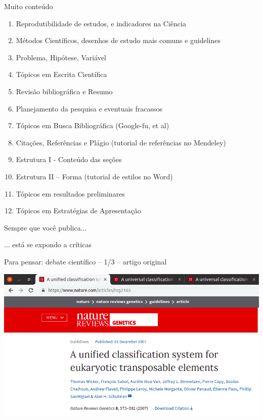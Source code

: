 \documentclass{beamer}
\begin{document}
\begin{frame}{Muito conteúdo}
  \begin{enumerate}
    \scriptsize
  \item Reprodutibilidade de estudos, e indicadores na Ciência
  \item Métodos Científicos, desenhos de estudo mais comuns e guidelines
  \item Problema, Hipótese, Variável
  \item Tópicos em Escrita Científica
  \item Revisão bibliográfica e Resumo
  \item Planejamento da pesquisa e eventuais fracassos
  \item Tópicos em Busca Bibliográfica (Google-fu, et al)
  \item Citações, Referências e Plágio (tutorial de referências no Mendeley)
  \item Estrutura I - Conteúdo das seções
  \item Estrutura II – Forma (tutorial de estilos no Word)
  \item Tópicos em resultados preliminares
  \item Tópicos em Estratégias de Apresentação
  \end{enumerate}
\end{frame}

\begin{frame}
  \begin{center}
    \Large

    Sempre que você publica...

    \bigskip
    \bigskip
    ... está se expondo a críticas
  \end{center}
\end{frame}

\begin{frame}{\tiny Para pensar: debate científico -- 1/3 -- artigo original}
  \begin{center}
    \includegraphics[width=\textwidth]{Encerramento/polemica1}
  \end{center}
\end{frame}
\end{document}
